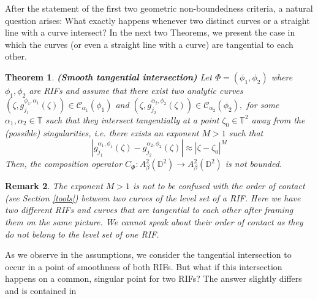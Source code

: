 \documentclass[12pt]{amsart}
\newtheorem{theorem}{Theorem}[section]
\newtheorem{remark}[theorem]{Remark}
\numberwithin{equation}{section}
\begin{document}
After the statement of the first two geometric non-boundedness criteria, a natural question arises: What exactly happens whenever two distinct curves or a straight line with a curve intersect? In the next two Theorems, we present the case in which the curves (or even a straight line with a curve) are tangential to each other. 
\begin{theorem}\label{smoothtangentlines}\textbf{(Smooth tangential intersection)} Let $\Phi=(\phi_1,\phi_2)$ where $\phi_1,\phi_2$ are RIFs and assume that there exist two analytic curves $(\zeta,g_{j_1}^{\phi_1,\alpha_1}(\zeta))\in\mathcal{C}_{{\alpha}_1}(\phi_1)$ and $(\zeta,g^{\alpha_2,\phi_2}_{j_2}(\zeta))\in\mathcal{C}_{\alpha_2}(\phi_2),$ for some $\alpha_1,\alpha_2\in\mathbb{T}$ such that they intersect tangentially at a point $\zeta_0\in\mathbb{T}^2$ away from the (possible) singularities, i.e. there exists an exponent $M>1$ such that 
$$|g^{\alpha_1,\phi_1}_{j_1}(\zeta)-g_{j_2}^{\alpha_2,\phi_2}(\zeta)|\approx |\zeta-\zeta_0|^M$$
Then, the composition operator $C_{\Phi}:A^2_{\beta}(\mathbb{D}^2)\to A^2_{\beta}(\mathbb{D}^2)$ is not bounded. 
\end{theorem}

\begin{remark} The exponent $M>1$ is not to be confused with the \textit{order of contact} (see Section \ref{tools}) between two curves of the level set of a RIF. Here we have two different RIFs and curves that are tangential to each other after framing them on the same picture. We cannot speak about their order of contact as they do not belong to the level set of one RIF.
\end{remark}

As we observe in the assumptions, we consider the tangential intersection to occur in a point of smoothness of both RIFs. But what if this intersection happens on a common, singular point for two RIFs? The answer slightly differs and is contained in
\end{document}
